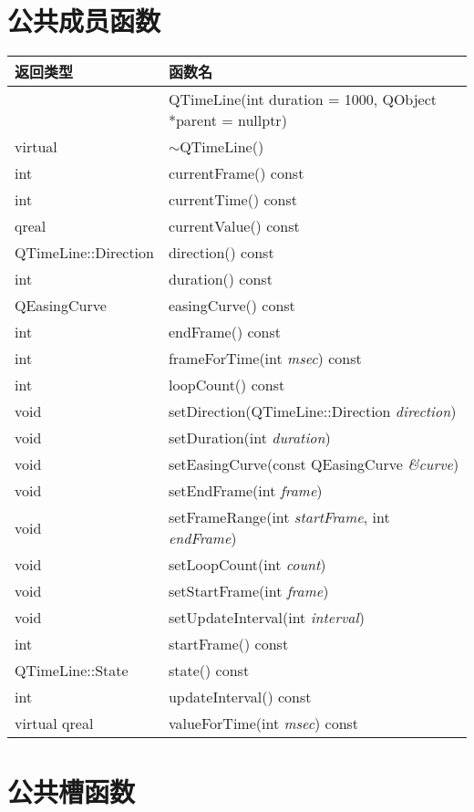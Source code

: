 \section{公共成员函数}

\begin{longtable}{|l|m{25em}|}
\hline
返回类型 	&函数名\\
\hline
& QTimeLine(int duration = 1000, QObject *parent = nullptr) \\ 
\hline
virtual &	$\sim$QTimeLine() \\ 
\hline
int &	currentFrame() const \\ 
\hline 
int &	currentTime() const \\ 
\hline
qreal &	currentValue() const\\
\hline
QTimeLine::Direction &	direction() const \\ 
\hline
int 	& duration() const \\ 
\hline
QEasingCurve &	easingCurve() const \\ 
\hline
int &	endFrame() const \\ 
\hline
int &	frameForTime(int \emph{msec}) const \\ 
\hline
int &	loopCount() const \\ 
\hline
void &	setDirection(QTimeLine::Direction \emph{direction}) \\ 
\hline
void &	setDuration(int \emph{duration}) \\ 
\hline
void &	setEasingCurve(const QEasingCurve \emph{\&curve}) \\
\hline
void 	& setEndFrame(int \emph{frame}) \\ 
\hline
void &	setFrameRange(int \emph{startFrame}, int \emph{endFrame})  \\ 
\hline
void &	setLoopCount(int \emph{count}) \\ 
\hline
void &	setStartFrame(int \emph{frame}) \\
\hline
void &	setUpdateInterval(int \emph{interval}) \\ 
\hline
int &	startFrame() const \\ 
\hline
QTimeLine::State &	state() const \\ 
\hline
int  &	updateInterval() const \\ 
\hline
virtual qreal &	valueForTime(int \emph{msec}) const \\ 
\hline	
\end{longtable}

\section{公共槽函数}

